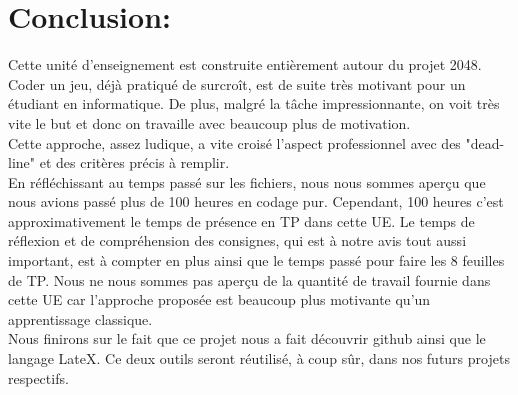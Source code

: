 \documentclass{report}
\begin{document}
\chapter{Conclusion:}
Cette unité d'enseignement est construite entièrement autour du projet 2048. Coder un jeu, déjà pratiqué de surcroît, est de suite très motivant pour un étudiant en informatique. De plus, malgré la tâche impressionnante, on voit très vite le but et donc on travaille avec beaucoup plus de motivation.\\
Cette approche, assez ludique, a vite croisé l'aspect professionnel avec des "dead-line" et des critères précis à remplir.\\
En réfléchissant au temps passé sur les fichiers, nous nous sommes aperçu que nous avions passé plus de 100 heures en codage pur. Cependant, 100 heures c'est approximativement le temps de présence en TP dans cette UE. Le temps de réflexion et de compréhension des consignes, qui est à notre avis tout aussi important, est à compter en plus ainsi que le temps passé pour faire les 8 feuilles de TP. Nous ne nous sommes pas aperçu de la quantité de travail fournie dans cette UE car l'approche proposée est beaucoup plus motivante qu'un apprentissage classique.\\
Nous finirons sur le fait que ce projet nous a fait découvrir github ainsi que le langage LateX. Ce deux outils seront réutilisé, à coup sûr, dans nos futurs projets respectifs.
\end{document}

